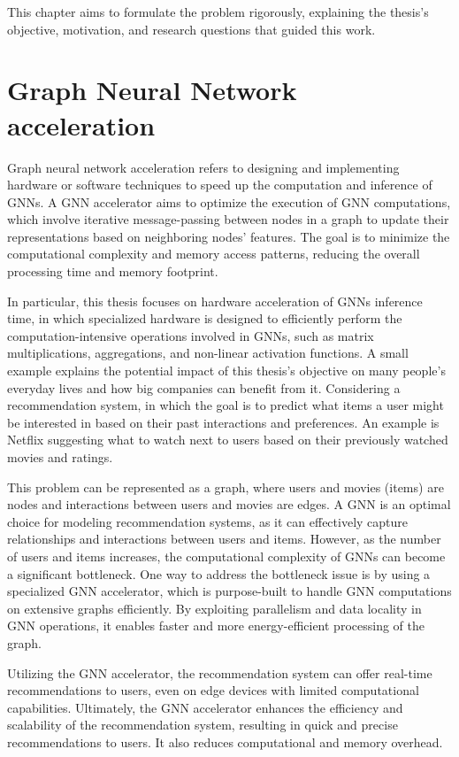 This chapter aims to formulate the problem rigorously, explaining the thesis's objective, motivation, and research questions that guided this work.

\section{Graph Neural Network acceleration}
\label{sec:gnn_acceleration}%

Graph neural network acceleration refers to designing and implementing hardware or software techniques to speed up the computation and inference of GNNs.
A GNN accelerator aims to optimize the execution of GNN computations, which involve iterative message-passing between nodes in a graph to update their representations based on neighboring nodes' features.
The goal is to minimize the computational complexity and memory access patterns, reducing the overall processing time and memory footprint.

In particular, this thesis focuses on hardware acceleration of GNNs inference time, in which specialized hardware is designed to efficiently perform the computation-intensive operations involved in GNNs, such as matrix multiplications, aggregations, and non-linear activation functions.
A small example explains the potential impact of this thesis's objective on many people's everyday lives and how big companies can benefit from it.
Considering a recommendation system, in which the goal is to predict what items a user might be interested in based on their past interactions and preferences.
An example is Netflix suggesting what to watch next to users based on their previously watched movies and ratings.

This problem can be represented as a graph, where users and movies (items) are nodes and interactions between users and movies are edges.
A GNN is an optimal choice for modeling recommendation systems, as it can effectively capture relationships and interactions between users and items.
However, as the number of users and items increases, the computational complexity of GNNs can become a significant bottleneck.
One way to address the bottleneck issue is by using a specialized GNN accelerator, which is purpose-built to handle GNN computations on extensive graphs efficiently.
By exploiting parallelism and data locality in GNN operations, it enables faster and more energy-efficient processing of the graph.

Utilizing the GNN accelerator, the recommendation system can offer real-time recommendations to users, even on edge devices with limited computational capabilities.
Ultimately, the GNN accelerator enhances the efficiency and scalability of the recommendation system, resulting in quick and precise recommendations to users. It also reduces computational and memory overhead.

